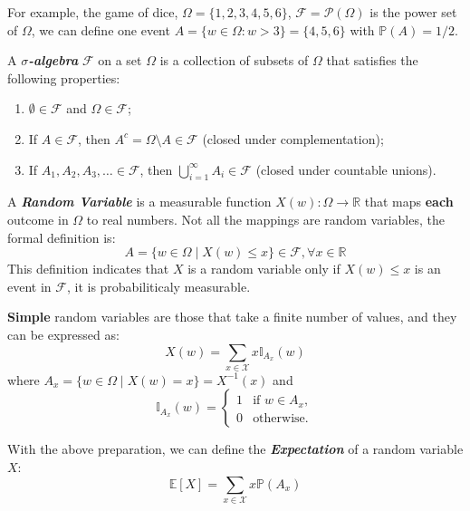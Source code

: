\documentclass[10pt]{elegantbook}
\newcommand{\mydefination}[1]{\textbf{\textit{\textcolor{structurecolor}{#1}}}}
\begin{document}
For example, the game of dice, $\Omega = \{1, 2, 3, 4, 5, 6\}$, $\mathcal F = \mathcal P(\Omega)$ is the power set of $\Omega$, we can define one 
event $A = \{ w \in \Omega : w > 3 \} = \{4, 5, 6 \}$ with $\mathbb P(A) = 1 / 2$. 

\begin{definition}
    A \mydefination{$\sigma$-algebra} $\mathcal F$ on a set $\Omega$ is a collection of subsets of $\Omega$ that satisfies the following properties:
    \begin{enumerate}
        \item $\emptyset \in \mathcal F$ and $\Omega \in \mathcal F$;
        \item If $A \in \mathcal F$, then $A^c = \Omega \setminus A \in \mathcal F$ (closed under complementation);
        \item If $A_1, A_2, A_3, \ldots \in \mathcal F$, then $\bigcup_{i=1}^{\infty} A_i \in \mathcal F$ (closed under countable unions).
    \end{enumerate}
\end{definition}

A \mydefination{Random Variable} is a measurable function $X(w): \Omega \rightarrow \mathbb R$ that maps \textbf{each} outcome in $\Omega$ to real numbers.
Not all the mappings are random variables, the formal definition is:
\[ A = \{ w \in \Omega \mid X(w) \leq x \} \in \mathcal F, \forall x \in \mathbb R \]
This definition indicates that $X$ is a random variable only if $X(w) \leq x$ is an event in $\mathcal F$, it is probabiliticaly measurable.

\textbf{Simple} random variables are those that take a finite number of values, and they can be expressed as:
\[ X(w) = \sum_{x \in \mathcal X} x \mathbb{I}_{A_x}(w) \]
where $A_x = \{ w \in \Omega \mid X(w) = x \} = X^{-1}(x)$
and
\[
\mathbb{I}_{A_x}(w) = \begin{cases}
    1 & \text{if } w \in A_x, \\
    0 & \text{otherwise}.
\end{cases}
\]

With the above preparation, we can define the \mydefination{Expectation} of a random variable $X$:
\begin{equation}
    \mathbb E[X] = \sum_{x \in \mathcal X} x \mathbb P(A_x)
\end{equation}
\end{document}
